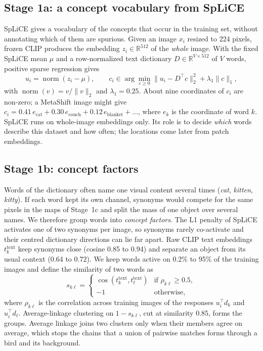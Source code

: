 \documentclass{article}
\begin{document}
\subsection{Stage 1a: a concept vocabulary from SpLiCE}
SpLiCE gives a vocabulary of the concepts that occur in the training set, without annotating which of them are spurious. Given an image $x_i$ resized to 224 pixels, frozen CLIP produces the embedding $z_i\in\mathbb{R}^{512}$ of the \emph{whole} image. With the fixed SpLiCE mean $\mu$ and a row-normalized text dictionary $D\in\mathbb{R}^{V\times 512}$ of $V$ words, positive sparse regression gives
\begin{equation}
 u_i=\operatorname{norm}(z_i-\mu),\qquad
 c_i\in\arg\min_{c\geq0}\|u_i-D^\top c\|_2^2+\lambda_1\|c\|_1,
\end{equation}
with $\operatorname{norm}(v)=v/\lVert v\rVert_2$ and $\lambda_1=0.25$. About nine coordinates of $c_i$ are non-zero; a MetaShift image might give $c_i=0.41\,e_{\text{cat}}+0.30\,e_{\text{couch}}+0.12\,e_{\text{blanket}}+\ldots$, where $e_k$ is the coordinate of word $k$. SpLiCE runs on whole-image embeddings only. Its role is to decide \emph{which} words describe this dataset and how often; the locations come later from patch embeddings.

\subsection{Stage 1b: concept factors}
Words of the dictionary often name one visual content several times (\emph{cat}, \emph{kitten}, \emph{kitty}). If each word kept its own channel, synonyms would compete for the same pixels in the maps of Stage~1c and split the mass of one object over several names. We therefore group words into \emph{concept factors}. The L1 penalty of SpLiCE activates one of two synonyms per image, so synonyms rarely co-activate and their centred dictionary directions can lie far apart. Raw CLIP text embeddings $t^{\text{text}}_k$ keep synonyms close (cosine 0.85 to 0.94) and separate an object from its usual context (0.64 to 0.72). We keep words active on 0.2\% to 95\% of the training images and define the similarity of two words as
\begin{equation}
 s_{k\ell}=
 \begin{cases}
 \cos(t^{\text{text}}_k,t^{\text{text}}_\ell) & \text{if } \rho_{k\ell}\geq0.5,\\
 -1 & \text{otherwise,}
 \end{cases}
\end{equation}
where $\rho_{k\ell}$ is the correlation across training images of the responses $u_i^\top d_k$ and $u_i^\top d_\ell$. Average-linkage clustering on $1-s_{k\ell}$, cut at similarity 0.85, forms the groups. Average linkage joins two clusters only when their members agree on average, which stops the chains that a union of pairwise matches forms through a bird and its background.
\end{document}
